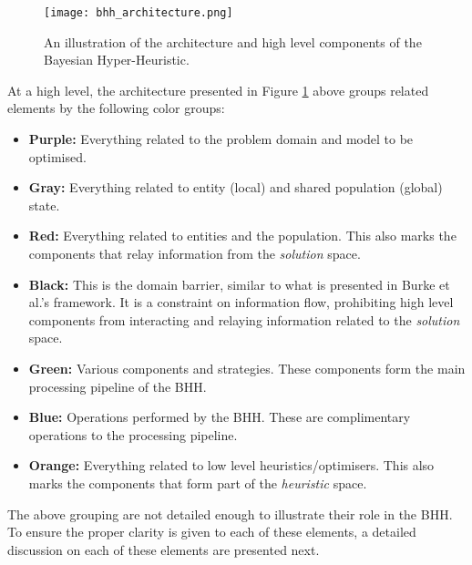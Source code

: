 \begin{figure}[H]
    \centering
    \texttt{[image: bhh\_architecture.png]}
    \caption[The Bayesian Hyper-Heuristic Architecture]{An illustration of
    the architecture and high level components of the Bayesian Hyper-Heuristic.}
    \label{fig:bhh_architecture}
\end{figure}

At a high level, the architecture presented in Figure \ref{fig:bhh_architecture} above groups related elements by the following color groups:

\begin{itemize}
    \item \textbf{Purple:} Everything related to the problem domain and model to be optimised.
    \item \textbf{Gray:} Everything related to entity (local) and shared population (global) state.
    \item \textbf{Red:} Everything related to entities and the population. This also marks the components that relay information from the \textit{solution} space.
    \item \textbf{Black:} This is the domain barrier, similar to what is presented in Burke et al.'s \cite{ref:burke:2010} framework. It is a constraint on information flow, prohibiting high level components from interacting and relaying information related to the \textit{solution} space.
    \item \textbf{Green:} Various components and strategies. These components form the main processing pipeline of the \Ac{BHH}.
    \item \textbf{Blue:} Operations performed by the \Ac{BHH}. These are complimentary operations to the processing pipeline.
    \item \textbf{Orange:} Everything related to low level heuristics/optimisers. This also marks the components that form part of the \textit{heuristic} space.
\end{itemize}

The above grouping are not detailed enough to illustrate their role in the \Ac{BHH}. To ensure the proper clarity is given to each of these elements, a detailed discussion on each of these elements are presented next.


